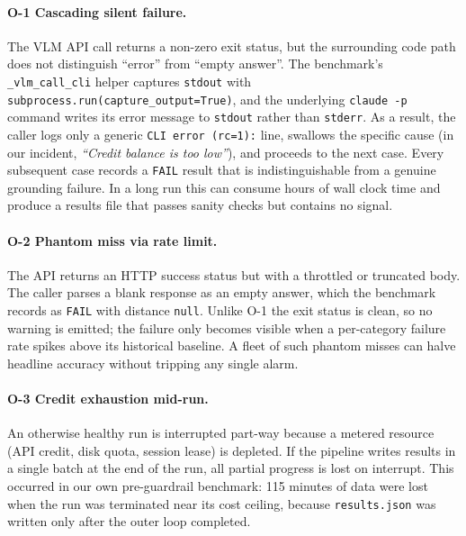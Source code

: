 \paragraph{O-1 Cascading silent failure.}
The VLM API call returns a non-zero exit status, but the surrounding
code path does not distinguish ``error'' from ``empty answer''.  The
benchmark's \texttt{\_vlm\_call\_cli} helper captures \texttt{stdout}
with \texttt{subprocess.run(capture\_output=True)}, and the underlying
\texttt{claude\ -p} command writes its error message to
\texttt{stdout} rather than \texttt{stderr}.  As a result, the caller
logs only a generic \texttt{CLI\ error\ (rc=1):} line, swallows the
specific cause (in our incident, \emph{``Credit balance is too
low''}), and proceeds to the next case.  Every subsequent case
records a \texttt{FAIL} result that is indistinguishable from a
genuine grounding failure.  In a long run this can consume hours of
wall clock time and produce a results file that passes sanity checks
but contains no signal.

\paragraph{O-2 Phantom miss via rate limit.}
The API returns an HTTP success status but with a throttled or
truncated body.  The caller parses a blank response as an empty
answer, which the benchmark records as \texttt{FAIL} with distance
\texttt{null}.  Unlike O-1 the exit status is clean, so no warning is
emitted; the failure only becomes visible when a per-category failure
rate spikes above its historical baseline.  A fleet of such phantom
misses can halve headline accuracy without tripping any single
alarm.

\paragraph{O-3 Credit exhaustion mid-run.}
An otherwise healthy run is interrupted part-way because a metered
resource (API credit, disk quota, session lease) is depleted.  If the
pipeline writes results in a single batch at the end of the run, all
partial progress is lost on interrupt.  This occurred in our own pre-guardrail
benchmark: 115 minutes of data were lost when the run was terminated
near its cost ceiling, because \texttt{results.json} was written only
after the outer loop completed.

